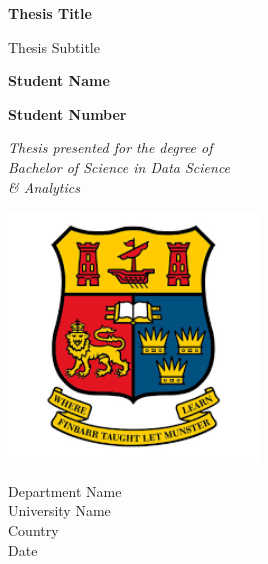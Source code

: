 \begin{titlepage}
    \begin{center}
        \vspace*{1cm}
        
        \Huge
        \textbf{Thesis Title}

        \vspace{0.5cm}
        
        \LARGE
        Thesis Subtitle
        
        \vspace{1.5cm}
        
        \textbf{Student Name}
        
        \vspace{0.8cm}
        
        \textbf{Student Number}
        
        \vspace{3cm}
        
        \textit{Thesis presented for the degree of\\
        Bachelor of Science in Data Science\\
        \& Analytics}
        
        \vspace{0.8cm}
        
        \includegraphics[width=0.5\textwidth]{images/ucc_logo.png}
        
        \large
        Department Name\\
        University Name\\
        Country\\
        Date
        
        
        \vspace{1cm}
        
        
        

    
        
        
        
        
        
        
        
        
    \end{center}
\end{titlepage}

